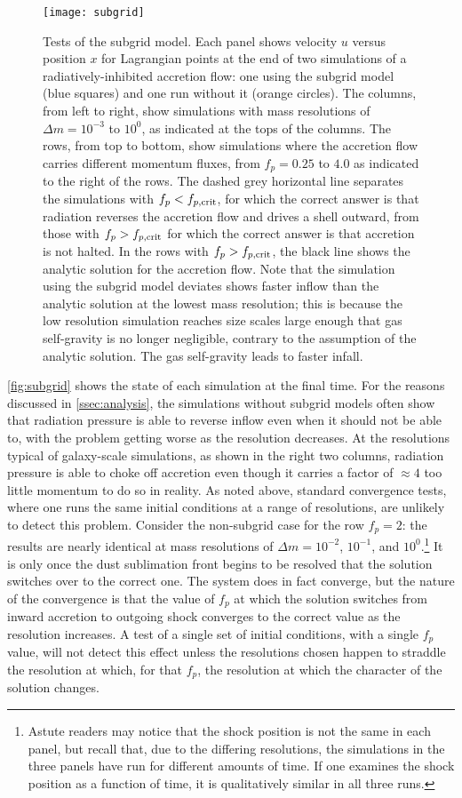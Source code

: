 \documentclass[useAMS,usenatbib]{mn2e}
\begin{document}
\begin{figure*}
\texttt{[image: subgrid]}
\caption{
\label{fig:subgrid}
Tests of the subgrid model. Each panel shows velocity $u$ versus position $x$ for Lagrangian points at the end of two simulations of a radiatively-inhibited accretion flow: one using the subgrid model (blue squares) and one run without it (orange circles). The columns, from left to right, show simulations with mass resolutions of $\Delta m = 10^{-3}$ to $10^0$, as indicated at the tops of the columns. The rows, from top to bottom, show simulations where the accretion flow carries different momentum fluxes, from $f_p = 0.25$ to $4.0$ as indicated to the right of the rows. The dashed grey horizontal line separates the simulations with $f_p < f_{p,\rm crit}$, for which the correct answer is that radiation reverses the accretion flow and drives a shell outward, from those with $f_p > f_{p,\rm crit}$ for which the correct answer is that accretion is not halted. In the rows with $f_p > f_{p,\rm crit}$, the black line shows the analytic solution for the accretion flow. Note that the simulation using the subgrid model deviates shows faster inflow than the analytic solution at the lowest mass resolution; this is because the low resolution simulation reaches size scales large enough that gas self-gravity is no longer negligible, contrary to the assumption of the analytic solution. The gas self-gravity leads to faster infall.
}
\end{figure*}

\autoref{fig:subgrid} shows the state of each simulation at the final time. For the reasons discussed in \autoref{ssec:analysis}, the simulations without subgrid models often show that radiation pressure is able to reverse inflow even when it should not be able to, with the problem getting worse as the resolution decreases. At the resolutions typical of galaxy-scale simulations, as shown in the right two columns, radiation pressure is able to choke off accretion even though it carries a factor of $\approx 4$ too little momentum to do so in reality. As noted above, standard convergence tests, where one runs the same initial conditions at a range of resolutions, are unlikely to detect this problem. Consider the non-subgrid case for the row $f_p = 2$: the results are nearly identical at mass resolutions of $\Delta m = 10^{-2}$, $10^{-1}$, and $10^0$.\footnote{Astute readers may notice that the shock position is not the same in each panel, but recall that, due to the differing resolutions, the simulations in the three panels have run for different amounts of time. If one examines the shock position as a function of time, it is qualitatively similar in all three runs.} It is only once the dust sublimation front begins to be resolved that the solution switches over to the correct one. The system does in fact converge, but the nature of the convergence is that the value of $f_p$ at which the solution switches from inward accretion to outgoing shock converges to the correct value as the resolution increases. A test of a single set of initial conditions, with a single $f_p$ value, will not detect this effect unless the resolutions chosen happen to straddle the resolution at which, for that $f_p$, the resolution at which the character of the solution changes.
\end{document}
